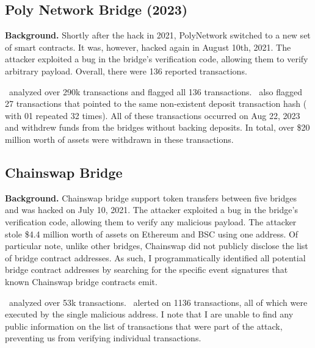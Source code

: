 


\subsection{Poly Network Bridge (2023)}
\textbf{Background.} Shortly after the hack in 2021,
PolyNetwork switched to a new set of smart contracts.  It was,
however, hacked again in August 10th, 2021. The attacker exploited a
bug in the bridge's verification code, allowing them to verify
arbitrary payload. Overall, there were 136 reported transactions.

 \offlinetool~analyzed over 290k transactions and flagged all 136 transactions. \offlinetool~also flagged 27 transactions that pointed to the same non-existent deposit transaction hash ( with 01 repeated 32 times).
All of these transactions occurred on Aug 22, 2023 and withdrew funds from the bridges without backing deposits. In total, over \$20 million worth of assets were withdrawn in these transactions.


\subsection{Chainswap Bridge}
\textbf{Background.} Chainswap bridge support token transfers between five bridges and 
was hacked on July 10, 2021. The attacker exploited a bug in the bridge's verification code, allowing them to verify any malicious payload. The attacker stole \$4.4 million worth of assets on Ethereum and BSC using one address. Of particular note, unlike other bridges, Chainswap did not publicly disclose the list of bridge contract addresses. 
As such, I programmatically identified all potential bridge contract addresses by searching for the specific event signatures that known Chainswap bridge contracts emit.

 \offlinetool~analyzed over 53k transactions. \offlinetool~alerted on 1136 transactions, all of which were executed by the single malicious address. I note that I are unable to find any public information on the list of transactions that were part of the attack, preventing us from verifying individual transactions.

